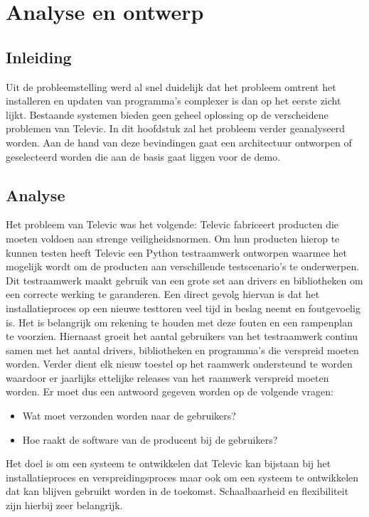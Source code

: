 \chapter{Analyse en ontwerp}\label{sec:anaEnOntwerp}
\section{Inleiding}
Uit de probleemstelling werd al snel duidelijk dat het probleem omtrent het installeren en updaten van programma's complexer is dan op het eerste zicht lijkt.
Bestaande systemen bieden geen geheel oplossing op de verscheidene problemen van Televic.
In dit hoofdstuk zal het probleem verder geanalyseerd worden.
Aan de hand van deze bevindingen gaat een architectuur ontworpen of geselecteerd worden die aan de basis gaat liggen voor de demo.

\section{Analyse}
Het probleem van Televic was het volgende:
Televic fabriceert producten die moeten voldoen aan strenge veiligheidsnormen.
Om hun producten hierop te kunnen testen heeft Televic een Python testraamwerk ontworpen waarmee het mogelijk wordt om de producten aan verschillende testscenario's te onderwerpen.
Dit testraamwerk maakt gebruik van een grote set aan drivers en bibliotheken om een correcte werking te garanderen.
Een direct gevolg hiervan is dat het installatieproces op een nieuwe testtoren veel tijd in beslag neemt en foutgevoelig is.
Het is belangrijk om rekening te houden met deze fouten en een rampenplan te voorzien.
Hiernaast groeit het aantal gebruikers van het testraamwerk continu samen met het aantal drivers, bibliotheken en programma's die verspreid moeten worden.
Verder dient elk nieuw toestel op het raamwerk ondersteund te worden waardoor er jaarlijks ettelijke releases van het raamwerk verspreid moeten worden.
Er moet dus een antwoord gegeven worden op de volgende vragen:
\begin{itemize}
\item Wat moet verzonden worden naar de gebruikers?
\item Hoe raakt de software van de producent bij de gebruikers?
\end{itemize}
Het doel is om een systeem te ontwikkelen dat Televic kan bijstaan bij het installatieproces en verspreidingsproces maar ook om een systeem te ontwikkelen dat kan blijven gebruikt worden in de toekomst.
Schaalbaarheid en flexibiliteit zijn hierbij zeer belangrijk.

